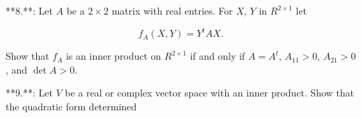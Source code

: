 

**8.**: Let \(A\) be a \(2\times 2\) matrix with real entries. For \(X\), \(Y\) in \(R^{2\times 1}\) let

\[f_{A}(X,Y)=Y^{t}AX.\]

Show that \(f_{A}\) is an inner product on \(R^{2\times 1}\) if and only if \(A=A^{t}\), \(A_{11}>0\), \(A_{21}>0\), and \(\det A>0\).

**9.**: Let \(V\) be a real or complex vector space with an inner product. Show that the quadratic form determined